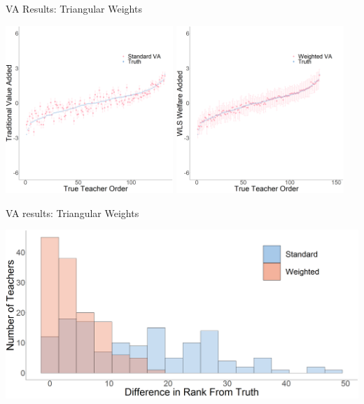 \documentclass[t,aspectratio=169,11pt]{beamer}
\begin{document}
\begin{frame}{VA Results: Triangular Weights} 

\centering
 \includegraphics[width=0.475\textwidth]{slides/Figures/standard_Kernal_caterpillar.png}
  \includegraphics[width=0.475\textwidth]{slides/Figures/ww_Kernal_caterpillar.png}
\end{frame}


\begin{frame}{VA results: Triangular Weights} 

\centering

\includegraphics[width=.75\linewidth]{slides/Figures/Histrogram_Kernal.png}

\scalebox{.8}{
    
}
\end{frame}
\end{document}
